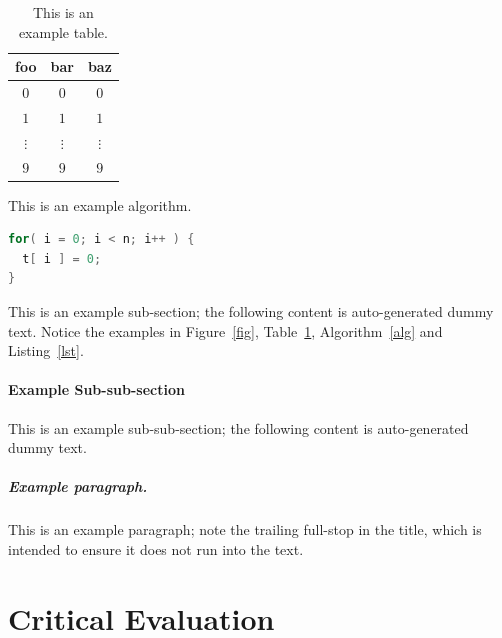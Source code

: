 \documentclass[ %
                    author={Jonathan Rankin},
                supervisor={Dr. David May, Dr. Ian Holyer},
                    degree={MEng},
                     title={CodeTouch},
                  subtitle={A Revolutionary Way To Program Real Code On Touch Screen Devices},
                      type={enterprise},
                      year={2015 } ]{dissertation}
\begin{document}
\begin{table}[t]
\centering
\begin{tabular}{|cc|c|}
\hline
foo      & bar      & baz      \\
\hline
$0     $ & $0     $ & $0     $ \\
$1     $ & $1     $ & $1     $ \\
$\vdots$ & $\vdots$ & $\vdots$ \\
$9     $ & $9     $ & $9     $ \\
\hline
\end{tabular}
\caption{This is an example table.}
\label{tab}
\end{table}

\begin{algorithm}[t]
\caption{This is an example algorithm.}
\label{alg}
\end{algorithm}

\begin{lstlisting}[float={t},caption={This is an example listing.},label={lst},language=C]
for( i = 0; i < n; i++ ) {
  t[ i ] = 0;
}
\end{lstlisting}

This is an example sub-section;
the following content is auto-generated dummy text.
Notice the examples in Figure~\ref{fig}, Table~\ref{tab}, Algorithm~\ref{alg}
and Listing~\ref{lst}.
\lipsum

\subsubsection{Example Sub-sub-section}

This is an example sub-sub-section;
the following content is auto-generated dummy text.
\lipsum

\paragraph{Example paragraph.}

This is an example paragraph; note the trailing full-stop in the title,
which is intended to ensure it does not run into the text.


\chapter{Critical Evaluation}
\label{chap:evaluation}
\end{document}
